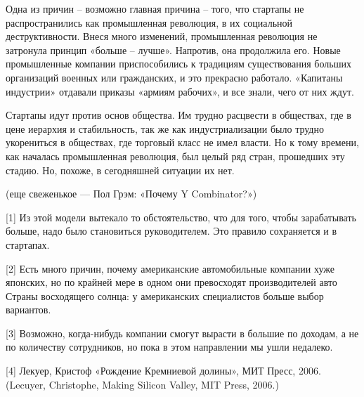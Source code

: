 \documentclass[ebook,12pt,oneside,openany]{memoir}
\begin{document}
Одна из причин – возможно главная причина – того, что стартапы не
распространились как промышленная революция, в их социальной
деструктивности. Внеся много изменений, промышленная революция не
затронула принцип «больше – лучше». Напротив, она продолжила его.
Новые промышленные компании приспособились к традициям существования
больших организаций военных или гражданских, и это прекрасно работало.
«Капитаны индустрии» отдавали приказы «армиям рабочих», и все знали,
чего от них ждут.

Стартапы идут против основ общества. Им трудно расцвести в обществах,
где в цене иерархия и стабильность, так же как индустриализации было
трудно укорениться в обществах, где торговый класс не имел власти. Но
к тому времени, как началась промышленная революция, был целый ряд
стран, прошедших эту стадию. Но, похоже, в сегодняшней ситуации их
нет.

(еще свеженькое — Пол Грэм: «Почему Y Combinator?»)

[1] Из этой модели вытекало то обстоятельство, что для того, чтобы
зарабатывать больше, надо было становиться руководителем. Это правило
сохраняется и в стартапах.

[2] Есть много причин, почему американские автомобильные компании хуже
японских, но по крайней мере в одном они превосходят производителей
авто Страны восходящего солнца: у американских специалистов больше
выбор вариантов.

[3] Возможно, когда-нибудь компании смогут вырасти в большие по
доходам, а не по количеству сотрудников, но пока в этом направлении мы
ушли недалеко.

[4] Лекуер, Кристоф «Рождение Кремниевой долины», МИТ Пресс, 2006.
(Lecuyer, Christophe, Making Silicon Valley, MIT Press, 2006.)
\end{document}
